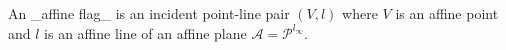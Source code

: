 An _affine flag_ is an incident point-line pair $(V, l)$ where $V$ is an affine point and $l$ is an affine line of an affine plane $\mathcal{A} = \mathcal{P}^{l_{\infty}}$.
